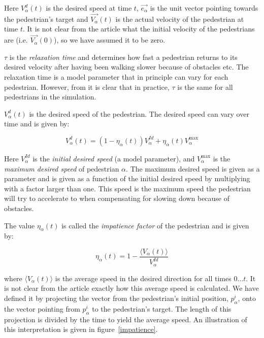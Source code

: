 Here $V_{\alpha}^{d}(t)$ is the desired speed at time $t$,
$\overrightarrow{e_{\alpha}}$ is the unit vector pointing towards the
pedestrian's target and  $\overrightarrow{V_{\alpha}}(t)$ is the actual
velocity of the pedestrian at time $t$. It is not clear from the article what
the initial velocity of the pedestrians are (i.e.
$\overrightarrow{V_\alpha}(0)$), so we have assumed it to be zero.


$\tau$ is the \emph{relaxation time} and determines how fast a pedestrian
returns to its desired velocity after having been walking slower because of
obstacles etc. The relaxation time is a model parameter that in principle can vary
for each pedestrian. However, from \cite{self-org} it is clear that in
practice, $\tau$ is the same for all pedestrians in the simulation.

$V_{\alpha}^{d}(t)$ is the desired speed of the pedestrian. The desired speed
can vary over time and is given by:

\begin{equation}\label{eqn:desired-speed}
    V_{\alpha}^{d}(t) = \left( 1 - \eta_{\alpha}(t) \right)
    V_{\alpha}^{Id} +
    \eta_{\alpha}(t) V_{\alpha}^{\text{max}}
\end{equation}

Here $V_{\alpha}^{Id}$ is the \emph{initial desired speed} (a model
parameter), and $V_{\alpha}^{\text{max}}$ is the \emph{maximum desired speed}
of pedestrian $\alpha$. The maximum desired speed is given as a parameter and
is given as a function of the initial desired speed by multiplying with a
factor larger than one. This speed is the maximum speed the pedestrian will
try to accelerate to when compensating for slowing down because of obstacles.

The value $\eta_{\alpha}(t)$ is called the \emph{impatience factor} of the
pedestrian and is given by:

\begin{equation}\label{eqn:impatience}
	\eta_{\alpha}(t) =
    1 - \frac{\langle V_{\alpha}(t)\rangle}{V^{Id}_{\alpha}}
\end{equation}

where $\langle V_{\alpha}(t) \rangle$ is the average speed in the desired
direction for all times $0\dots t$. It is not clear from the article exactly
how this average speed is calculated. We have defined it by projecting the
vector from the pedestrian's initial position, $p^i_\alpha$, onto the vector
pointing from $p^i_\alpha$ to the pedestrian's target. The length of this
projection is divided by the time to yield the average speed. An
illustration of this interpretation is given in figure~\ref{impatience}.

